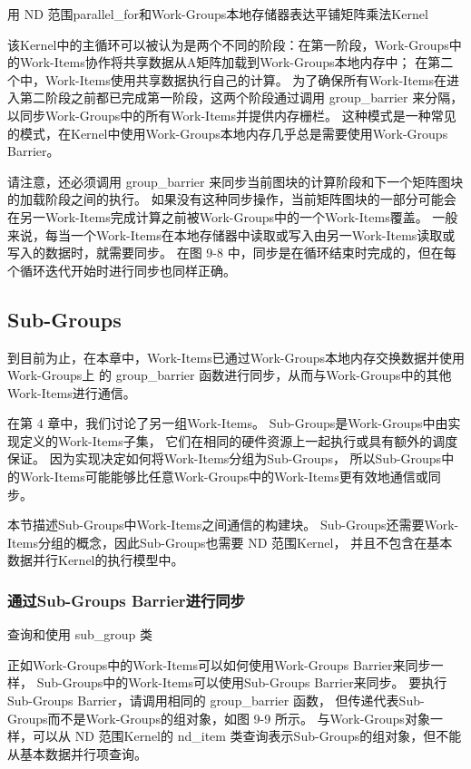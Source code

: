 {\color{red} 用 ND 范围parallel\_for和Work-Groups本地存储器表达平铺矩阵乘法Kernel}

该Kernel中的主循环可以被认为是两个不同的阶段：在第一阶段，Work-Groups中的Work-Items协作将共享数据从A矩阵加载到Work-Groups本地内存中； 
在第二个中，Work-Items使用共享数据执行自己的计算。 
为了确保所有Work-Items在进入第二阶段之前都已完成第一阶段，这两个阶段通过调用 group\_barrier 来分隔，
以同步Work-Groups中的所有Work-Items并提供内存栅栏。 
这种模式是一种常见的模式，在Kernel中使用Work-Groups本地内存几乎总是需要使用Work-Groups Barrier。

请注意，还必须调用 group\_barrier 来同步当前图块的计算阶段和下一个矩阵图块的加载阶段之间的执行。 
如果没有这种同步操作，当前矩阵图块的一部分可能会在另一Work-Items完成计算之前被Work-Groups中的一个Work-Items覆盖。 
一般来说，每当一个Work-Items在本地存储器中读取或写入由另一Work-Items读取或写入的数据时，就需要同步。 
在图 9-8 中，同步是在循环结束时完成的，但在每个循环迭代开始时进行同步也同样正确。

\subsection{Sub-Groups}
到目前为止，在本章中，Work-Items已通过Work-Groups本地内存交换数据并使用Work-Groups上
的 group\_barrier 函数进行同步，从而与Work-Groups中的其他Work-Items进行通信。

在第 4 章中，我们讨论了另一组Work-Items。 Sub-Groups是Work-Groups中由实现定义的Work-Items子集，
它们在相同的硬件资源上一起执行或具有额外的调度保证。 
因为实现决定如何将Work-Items分组为Sub-Groups，
所以Sub-Groups中的Work-Items可能能够比任意Work-Groups中的Work-Items更有效地通信或同步。

本节描述Sub-Groups中Work-Items之间通信的构建块。 
Sub-Groups还需要Work-Items分组的概念，因此Sub-Groups也需要 ND 范围Kernel，
并且不包含在基本数据并行Kernel的执行模型中。

\subsubsection{通过Sub-Groups Barrier进行同步}
{\color{red} 查询和使用 sub\_group 类}

正如Work-Groups中的Work-Items可以如何使用Work-Groups Barrier来同步一样，
Sub-Groups中的Work-Items可以使用Sub-Groups Barrier来同步。 
要执行Sub-Groups Barrier，请调用相同的 group\_barrier 函数，
但传递代表Sub-Groups而不是Work-Groups的组对象，如图 9-9 所示。 
与Work-Groups对象一样，可以从 ND 范围Kernel的 nd\_item 类查询表示Sub-Groups的组对象，但不能从基本数据并行项查询。

